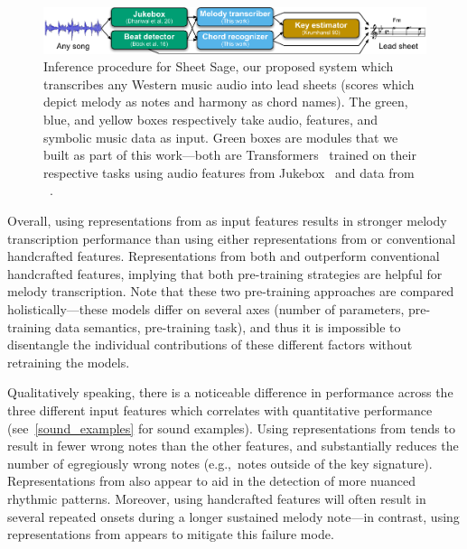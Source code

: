 \begin{figure}
    \centering
    \includegraphics[width=\linewidth]{figs/sheetsage.pdf}
    \caption{
    Inference procedure for Sheet Sage, our proposed system which transcribes any Western music audio into lead sheets (scores which depict melody as notes and harmony as chord names). The green, blue, and yellow boxes respectively take audio, features, and symbolic music data as input. Green boxes are modules that we built as part of this work---both are Transformers~\cite{vaswani2017attention} trained on their respective tasks using audio features from Jukebox~\cite{dhariwal2020jukebox} and data from \hooktheory~\cite{hooktheory}.
    }
    \label{fig:sheet_sage}
    \vspace{-3mm}
\end{figure}

Overall, using representations from \jukebox{} as input features results in stronger melody transcription performance than using either representations from \mtthree{} or conventional handcrafted features. 
Representations from both \mtthree{} and \jukebox{} outperform conventional handcrafted features, 
implying that both pre-training strategies are helpful for melody transcription. 
Note that these two pre-training approaches are compared holistically---these models differ on several axes 
(number of parameters, 
pre-training data semantics, 
pre-training task), 
and thus it is impossible to disentangle the individual contributions of these different factors without retraining the models. 

Qualitatively speaking, there is a noticeable difference in performance across the three different input features which correlates with quantitative performance (see~\cref{sound_examples} for sound examples). 
Using representations from \jukebox{} tends to result in fewer wrong notes than the other features, and substantially reduces the number of egregiously wrong notes (e.g.,~notes outside of the key signature). 
Representations from \jukebox{} also appear to aid in the detection of more nuanced rhythmic patterns. 
Moreover, using handcrafted features will often result in several repeated onsets during a longer sustained melody note---in contrast, using representations from \jukebox{} appears to mitigate this failure mode.

